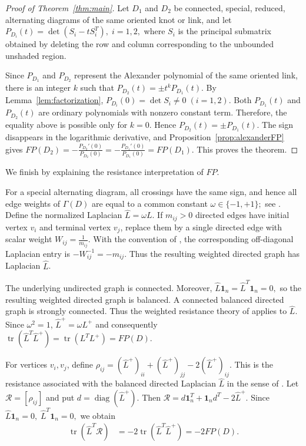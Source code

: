 \documentclass[a4paper,12pt]{amsart}
\numberwithin{equation}{section}
\theoremstyle{plain}
\theoremstyle{definition}
\begin{document}
\begin{proof}[Proof of Theorem~\ref{thm:main}]
	Let $D_1$ and $D_2$ be connected, special, reduced, alternating diagrams of the
	same oriented knot or link, and let
	$
	P_{D_i}(t)=\det(S_i-tS_i^T),
	\; i=1,2,
	$
	where $S_i$ is the principal submatrix obtained by deleting the row and
	column corresponding to the unbounded unshaded region.
	
	Since $P_{D_1}$ and $P_{D_2}$ represent the Alexander polynomial of
	the same oriented link, there is an integer $k$ such that
	$
	P_{D_2}(t)=\pm t^k P_{D_1}(t).
	$
	By Lemma~\ref{lem:factorization},
	$
	P_{D_i}(0)=\det S_i\neq0
	\; (i=1,2).
	$
	Both $P_{D_1}(t)$ and $P_{D_2}(t)$ are ordinary polynomials with
	nonzero constant term. Therefore, the equality above is possible
	only for $k=0$. Hence
	$
	P_{D_2}(t)=\pm P_{D_1}(t).
	$
	The sign disappears in the logarithmic derivative, and
	Proposition~\ref{prop:alexanderFP} gives
	$
	FP(D_2)
	=
	-\frac{P_{D_2}'(0)}{P_{D_2}(0)}
	=
	-\frac{P_{D_1}'(0)}{P_{D_1}(0)}
	=
	FP(D_1).
	$
	This proves the theorem.
\end{proof}


We finish by explaining the resistance interpretation of $FP$.

For a special alternating diagram, all crossings have the same sign,
and hence all edge weights of $\Gamma(D)$ are equal to a common
constant
$
\omega\in\{-1,+1\};
$
see \cite{Sto05}. 
Define the normalized Laplacian
$
\widehat L=\omega L.
$
If $m_{ij}>0$ directed edges have initial vertex $v_i$ and
terminal vertex $v_j$, replace them by a single directed edge
with scalar weight
$
W_{ij}=\frac{1}{m_{ij}}.
$
With the convention of \cite{BBG23}, the corresponding
off-diagonal Laplacian entry is
$
-W_{ij}^{-1}=-m_{ij}.
$
Thus the resulting weighted directed graph has Laplacian
$\widehat L$.

The underlying undirected graph is connected. Moreover,
$
\widehat L\mathbf{1}_n=\widehat L^T\mathbf{1}_n=0,
$
so the resulting weighted directed graph is balanced. A connected
balanced directed graph is strongly connected. Thus the weighted
resistance theory of \cite{BBG23} applies to $\widehat L$.
Since $\omega^2=1$,
$
\widehat L^+=\omega L^+
$
and consequently
$
\operatorname{tr}(\widehat L^T\widehat L^+)
=
\operatorname{tr}(L^TL^+)
=
FP(D).
$

For vertices $v_i,v_j$, define
$
\rho_{ij}
=
(\widehat L^+)_{ii}
+
(\widehat L^+)_{jj}
-
2(\widehat L^+)_{ij}.
$
This is the resistance associated with the balanced directed
Laplacian $\widehat L$ in the sense of \cite{BBG23}. Let
$\mathcal R=[\rho_{ij}]$ and put
$
d=\operatorname{diag}(\widehat L^+).
$
Then
$
\mathcal R
=
d\mathbf{1}_n^T
+
\mathbf{1}_n d^T
-
2\widehat L^+.
$
Since
$
\widehat L\mathbf{1}_n=0,
\;
\widehat L^T\mathbf{1}_n=0,
$
we obtain
\begin{align*}
	\operatorname{tr}(\widehat L^T\mathcal R)
	&=
	-2\operatorname{tr}
	(\widehat L^T\widehat L^+)
	=
	-2FP(D).
\end{align*}
\end{document}
